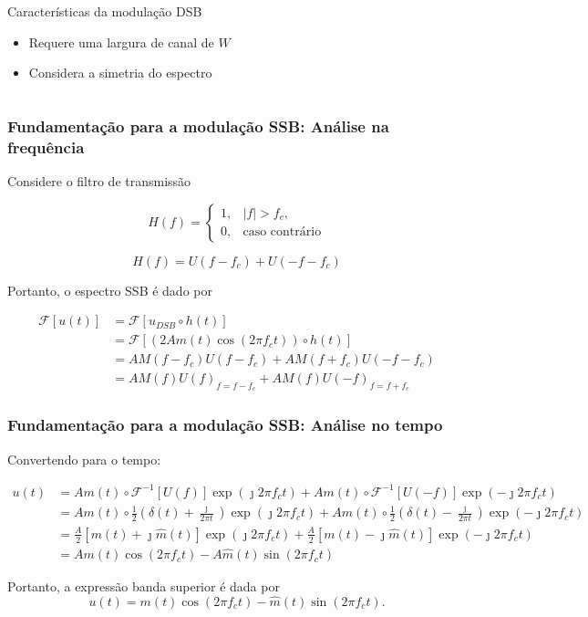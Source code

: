 \documentclass[10pt,hyperref={pdfpagemode=FullScreen},aspectratio=169]{beamer}
\begin{document}
\begin{frame}
\begin{columns}[T]
\begin{column}{0.5\textwidth}
      \begin{block}{Características da modulação DSB}
        \begin{itemize}
          \item Requere uma largura de canal de $W$
          \item Considera a simetria do espectro
        \end{itemize}
      \end{block}
    \end{column}


   \end{columns}

  
\end{frame}

\begin{frame}
  \frametitle{Fundamentação para a modulação SSB: Análise na frequência}

  Considere o filtro de transmissão 

$$
H(f) = \begin{cases}
1, & |f| > f_c, \\
0, & \textrm{caso contrário}
\end{cases}
$$

$$
H(f) = U(f - f_c) + U(-f - f_c)
$$

Portanto, o espectro SSB é dado por 

\begin{align*}
  \mathcal{F}[u(t)] & = \mathcal{F}[u_{DSB} \circ h(t)]  \\
                    & = \mathcal{F}[(2Am(t)\cos(2\pi f_ct)) \circ h(t)] \\
                    & = AM(f - f_c)U(f -f_c) + AM(f + f_c)U(-f -f_c) \\
                    & = AM(f)U(f)_{f = f-f_c} + AM(f)U(-f)_{f = f+f_c}
\end{align*}

\end{frame}

\begin{frame}
  \frametitle{Fundamentação para a modulação SSB: Análise no tempo}

  Convertendo para o tempo:


\begin{align*} 
u(t) &= A m(t) \circ  \mathcal{F}^{-1}[U(f)] \exp(\jmath 2 \pi f_c t) + A m(t) \circ  \mathcal{F}^{-1}[U(-f)] \exp(-\jmath 2 \pi f_c t) \\
     &= A m(t) \circ \frac{1}{2}\left( \delta (t) + \frac{\jmath}{2\pi t} \right)\exp(\jmath 2 \pi f_c t) +  A m(t) \circ \frac{1}{2}\left( \delta (t) - \frac{\jmath}{2\pi t} \right)\exp(-\jmath 2 \pi f_c t) \\
     &= \frac{A}{2}[m(t) + \jmath \hat{m}(t)]\exp(\jmath 2 \pi f_c t) + \frac{A}{2}[m(t) - \jmath \hat{m}(t)]\exp(-\jmath 2 \pi f_c t) \\
     &= Am(t)\cos( 2 \pi f_c t) - A\hat{m}(t)\sin( 2 \pi f_c t) 
\end{align*}

Portanto, a expressão banda superior é dada por
$$
u(t) = m(t)\cos( 2 \pi f_c t) - \hat{m}(t)\sin( 2 \pi f_c t).
$$
\end{frame}
\end{document}
